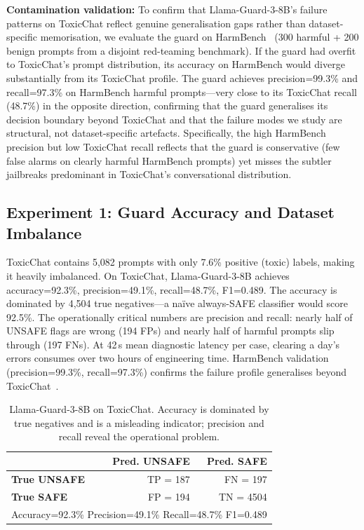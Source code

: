 \documentclass[letterpaper]{article}
\begin{document}
\textbf{Contamination validation:} To confirm that Llama-Guard-3-8B's failure patterns
on ToxicChat reflect genuine generalisation gaps rather than dataset-specific
memorisation, we evaluate the guard on HarmBench~\cite{mazeika2024harmbench} (300
harmful + 200 benign prompts from a disjoint red-teaming benchmark). If the guard had
overfit to ToxicChat's prompt distribution, its accuracy on HarmBench would diverge
substantially from its ToxicChat profile. The guard achieves precision=99.3\% and
recall=97.3\% on HarmBench harmful prompts---very close to its ToxicChat recall
(48.7\%) in the opposite direction, confirming that the guard generalises its
decision boundary beyond ToxicChat and that the failure modes we study are structural,
not dataset-specific artefacts. Specifically, the high HarmBench precision but low
ToxicChat recall reflects that the guard is conservative (few false alarms on
clearly harmful HarmBench prompts) yet misses the subtler jailbreaks predominant
in ToxicChat's conversational distribution.

\subsection{Experiment 1: Guard Accuracy and Dataset Imbalance}

ToxicChat contains 5,082 prompts with only 7.6\% positive (toxic) labels, making it
heavily imbalanced. On ToxicChat, Llama-Guard-3-8B achieves accuracy=92.3\%,
precision=49.1\%, recall=48.7\%, F1=0.489. The accuracy is dominated by 4,504 true
negatives---a na\"ive always-SAFE classifier would score 92.5\%. The operationally
critical numbers are precision and recall: nearly half of UNSAFE flags are wrong (194 FPs)
and nearly half of harmful prompts slip through (197 FNs). At 42\,s mean diagnostic
latency per case, clearing a day's errors consumes over two hours of engineering time.
HarmBench validation (precision=99.3\%, recall=97.3\%) confirms the failure profile
generalises beyond ToxicChat~\cite{mazeika2024harmbench}.

\begin{table}[h]
\centering
\small
\caption{Llama-Guard-3-8B on ToxicChat. Accuracy is dominated by true negatives and
is a misleading indicator; precision and recall reveal the operational problem.}
\label{tab:confusion}
\begin{tabular}{lrr}
\toprule
 & \textbf{Pred. UNSAFE} & \textbf{Pred. SAFE} \\
\midrule
\textbf{True UNSAFE} & TP = 187 & FN = 197 \\
\textbf{True SAFE}   & FP = 194 & TN = 4504 \\
\midrule
\multicolumn{3}{l}{Accuracy=92.3\% \quad Precision=49.1\% \quad Recall=48.7\% \quad F1=0.489} \\
\bottomrule
\end{tabular}
\end{table}
\end{document}

